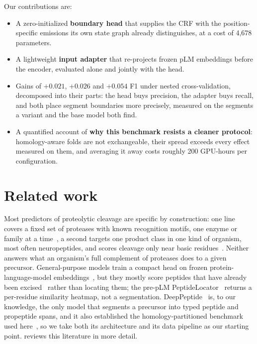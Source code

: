 \documentclass{article}
\begin{document}
Our contributions are:
\begin{itemize}\setlength{\itemsep}{1pt}\setlength{\parskip}{0pt}
  \item A zero-initialized \textbf{boundary head} that supplies the CRF with the position-specific emissions its own state graph already distinguishes, at a cost of 4{,}678 parameters.
  \item A lightweight \textbf{input adapter} that re-projects frozen pLM embeddings before the encoder, evaluated alone and jointly with the head.
  \item Gains of $+0.021$, $+0.026$ and $+0.054$ F1 under nested cross-validation, decomposed into their parts: the head buys precision, the adapter buys recall, and both place segment boundaries more precisely, measured on the segments a variant and the base model both find.
  \item A quantified account of \textbf{why this benchmark resists a cleaner protocol}: homology-aware folds are not exchangeable, their spread exceeds every effect measured on them, and averaging it away costs roughly 200 GPU-hours per configuration.
\end{itemize}


\section{Related work}
\label{sec:related}

Most predictors of proteolytic cleavage are specific by construction: one line covers a fixed set of proteases with known recognition motifs, one enzyme or family at a time~\citep{duckert2004prop,song2012prosper,li2023prosperousplus,li2020deepcleave,li2020procleave}, a second targets one product class in one kind of organism, most often neuropeptides, and scores cleavage only near basic residues~\citep{southey2006neuropred,wang2024deepneuropepred}. Neither answers what an organism's full complement of proteases does to a given precursor. General-purpose models train a compact head on frozen protein-language-model embeddings~\citep{lin2023esm2,esm_cambrian_blog_2024}, but they mostly score peptides that have already been excised~\citep{du2024plm4ace,bpfun2025} rather than locating them; the pre-pLM PeptideLocator~\citep{mooney2013peptidelocator} returns a per-residue similarity heatmap, not a segmentation. DeepPeptide~\citep{deeppeptide2023} is, to our knowledge, the only model that segments a precursor into typed peptide and propeptide spans, and it also established the homology-partitioned benchmark used here~\citep{graphpart2023}, so we take both its architecture and its data pipeline as our starting point.  reviews this literature in more detail.
\end{document}
